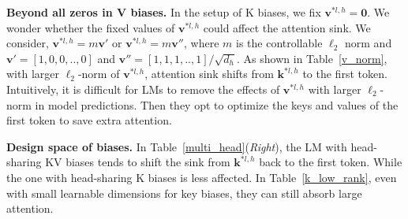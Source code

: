 
\textbf{Beyond all zeros in V biases.} In the setup of K biases, we fix $\boldsymbol{v}^{*l,h}=\boldsymbol{0}$. We wonder whether the fixed values of $\boldsymbol{v}^{*l,h}$ could affect the attention sink. We consider, $\boldsymbol{v}^{*l,h}=m\boldsymbol{v}'$ or $\boldsymbol{v}^{*l,h}=m\boldsymbol{v}''$, where $m$ is the controllable $\ell_2$ norm and $\boldsymbol{v}'=[1,0,0,..,0]$ and $\boldsymbol{v}''=[1,1,1,..,1]/ \sqrt{d_h}$. As shown in Table~\ref{v_norm}, with larger $\ell_2$-norm of $\boldsymbol{v}^{*l,h}$, attention sink shifts from $\boldsymbol{k}^{*l,h}$ to the first token. Intuitively, it is difficult for LMs to remove the effects of $\boldsymbol{v}^{*l,h}$ with larger $\ell_2$-norm in model predictions. Then they opt to optimize the keys and values of the first token to save extra attention. 

\textbf{Design space of biases.} In Table~\ref{multi_head}(\emph{Right}), the LM with head-sharing KV biases tends to shift the sink from $\boldsymbol{k}^{*l,h}$ back to the first token. While the one with head-sharing K biases is less affected. In Table~\ref{k_low_rank}, even with small learnable dimensions for key biases, they can still absorb large attention.

